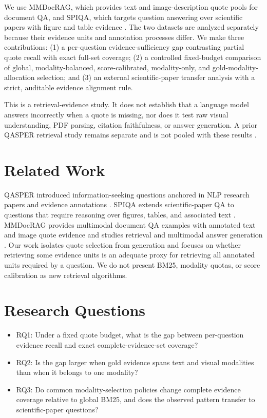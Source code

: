 \documentclass[11pt]{article}
\begin{document}
We use MMDocRAG, which provides text and image-description quote pools for document QA, and SPIQA, which targets question answering over scientific papers with figure and table evidence \citep{dong-etal-2025-mmdocrag,pramanick-etal-2024-spiqa}. The two datasets are analyzed separately because their evidence units and annotation processes differ. We make three contributions: (1) a per-question evidence-sufficiency gap contrasting partial quote recall with exact full-set coverage; (2) a controlled fixed-budget comparison of global, modality-balanced, score-calibrated, modality-only, and gold-modality-allocation selection; and (3) an external scientific-paper transfer analysis with a strict, auditable evidence alignment rule.

This is a retrieval-evidence study. It does not establish that a language model answers incorrectly when a quote is missing, nor does it test raw visual understanding, PDF parsing, citation faithfulness, or answer generation. A prior QASPER retrieval study remains separate and is not pooled with these results \citep{dasigi-etal-2021-dataset}.

\section{Related Work}
QASPER introduced information-seeking questions anchored in NLP research papers and evidence annotations \citep{dasigi-etal-2021-dataset}. SPIQA extends scientific-paper QA to questions that require reasoning over figures, tables, and associated text \citep{pramanick-etal-2024-spiqa}. MMDocRAG provides multimodal document QA examples with annotated text and image quote evidence and studies retrieval and multimodal answer generation \citep{dong-etal-2025-mmdocrag}. Our work isolates quote selection from generation and focuses on whether retrieving some evidence units is an adequate proxy for retrieving all annotated units required by a question. We do not present BM25, modality quotas, or score calibration as new retrieval algorithms.

\section{Research Questions}
\begin{itemize}
  \item RQ1: Under a fixed quote budget, what is the gap between per-question evidence recall and exact complete-evidence-set coverage?
  \item RQ2: Is the gap larger when gold evidence spans text and visual modalities than when it belongs to one modality?
  \item RQ3: Do common modality-selection policies change complete evidence coverage relative to global BM25, and does the observed pattern transfer to scientific-paper questions?
\end{itemize}
\end{document}

